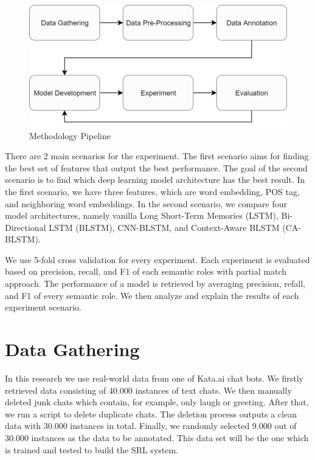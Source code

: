 \begin{figure}
	\centering
	\includegraphics[width=\linewidth]{images/pipeline}
	\caption{Methodology Pipeline}
	\label{fig:pipeline}
\end{figure}

There are 2 main scenarios for the experiment. The first scenario aims for finding the best set of features that output the best performance. The goal of the second scenario is to find which deep learning model architecture has the best result. In the first scenario, we have three features, which are word embedding, POS tag, and neighboring word embeddings. In the second scenario, we compare four model architectures, namely vanilla Long Short-Term Memories (LSTM), Bi-Directional LSTM (BLSTM), CNN-BLSTM, and Context-Aware BLSTM (CA-BLSTM).

We use 5-fold cross validation for every experiment. Each experiment is evaluated based on precision, recall, and F1 of each semantic roles with partial match approach. The performance of a model is retrieved by averaging precision, refall, and F1 of every semantic role.  We then analyze and explain the results of each experiment scenario.

\section{Data Gathering}
In this research we use real-world data from one of Kata.ai chat bots. We firstly retrieved data consisting of 40.000 instances of text chats. We then manually deleted junk chats which contain, for example, only laugh or greeting. After that, we run a script to delete duplicate chats. The deletion process outputs a clean data with 30.000 instances in total. Finally, we randomly selected 9.000 out of 30.000 instances as the data to be annotated. This data set will be the one which is trained and tested to build the SRL system.


